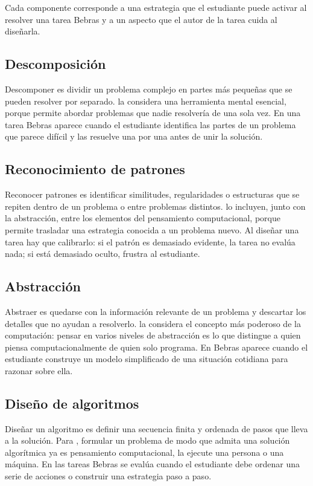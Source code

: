 Cada componente corresponde a una estrategia que el estudiante puede activar al resolver una tarea Bebras y a un aspecto que el autor de la tarea cuida al diseñarla.

\subsection{Descomposición}

Descomponer es dividir un problema complejo en partes más pequeñas que se pueden resolver por separado. \textcite[34]{wing2006} la considera una herramienta mental esencial, porque permite abordar problemas que nadie resolvería de una sola vez. En una tarea Bebras aparece cuando el estudiante identifica las partes de un problema que parece difícil y las resuelve una por una antes de unir la solución.

\subsection{Reconocimiento de patrones}

Reconocer patrones es identificar similitudes, regularidades o estructuras que se repiten dentro de un problema o entre problemas distintos. \textcite[39]{grover2013} lo incluyen, junto con la abstracción, entre los elementos del pensamiento computacional, porque permite trasladar una estrategia conocida a un problema nuevo. Al diseñar una tarea hay que calibrarlo: si el patrón es demasiado evidente, la tarea no evalúa nada; si está demasiado oculto, frustra al estudiante.

\subsection{Abstracción}

Abstraer es quedarse con la información relevante de un problema y descartar los detalles que no ayudan a resolverlo. \textcite[35]{wing2006} la considera el concepto más poderoso de la computación: pensar en varios niveles de abstracción es lo que distingue a quien piensa computacionalmente de quien solo programa. En Bebras aparece cuando el estudiante construye un modelo simplificado de una situación cotidiana para razonar sobre ella.

\subsection{Diseño de algoritmos}

Diseñar un algoritmo es definir una secuencia finita y ordenada de pasos que lleva a la solución. Para \textcite[33]{wing2006}, formular un problema de modo que admita una solución algorítmica ya es pensamiento computacional, la ejecute una persona o una máquina. En las tareas Bebras se evalúa cuando el estudiante debe ordenar una serie de acciones o construir una estrategia paso a paso.

